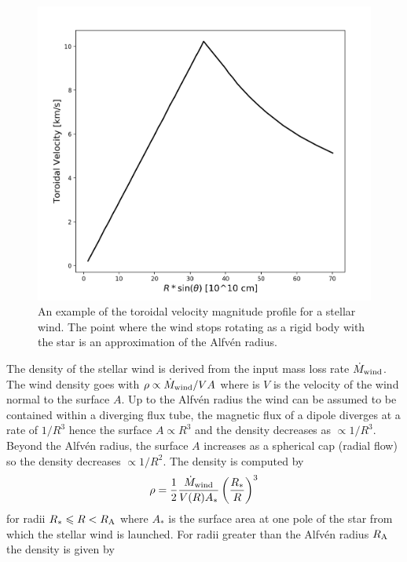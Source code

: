 \documentclass[fleqn,usenatbib]{mnras}
\begin{document}
\begin{figure}
    \centering
    \includegraphics[width=\linewidth]{figures/torVel}
    \caption{An example of the toroidal velocity magnitude profile for a stellar wind. The point where the wind stops rotating as a rigid body with the star is an approximation of the Alfv\'en radius.}
    \label{fig:polVel}
\end{figure}

The density of the stellar wind is derived from the input mass loss rate $\dot{M}_{\rm wind}$. The wind density goes with $\rho \propto \dot{M}_{\rm wind}/VA$ where is $V$ is the velocity of the wind normal to the surface $A$. Up to the Alfv\'en radius the wind can be assumed to be contained within a diverging flux tube, the magnetic flux of a dipole diverges at a rate of $1/R^3$ hence the surface $A \propto R^3$ and the density decreases as $\propto 1/R^3$. Beyond the Alfv\'en radius, the surface $A$ increases as a spherical cap (radial flow) so the density decreases $\propto 1/R^2$. The density is computed by
\begin{equation}
    \rho = \frac{1}{2}\frac{\dot{M}_{\rm wind}}{V(R)A_{\ast}}\left( \frac{R_{\ast}}{R}\right)^3
\end{equation}
for radii $R_{\ast}\leq R < R_{\rm A}$ where $A_{\ast}$ is the surface area at one pole of the star from which the stellar wind is launched. For radii greater than the Alfv\'en radius $R_{\rm A}$ the density is given by
\end{document}
